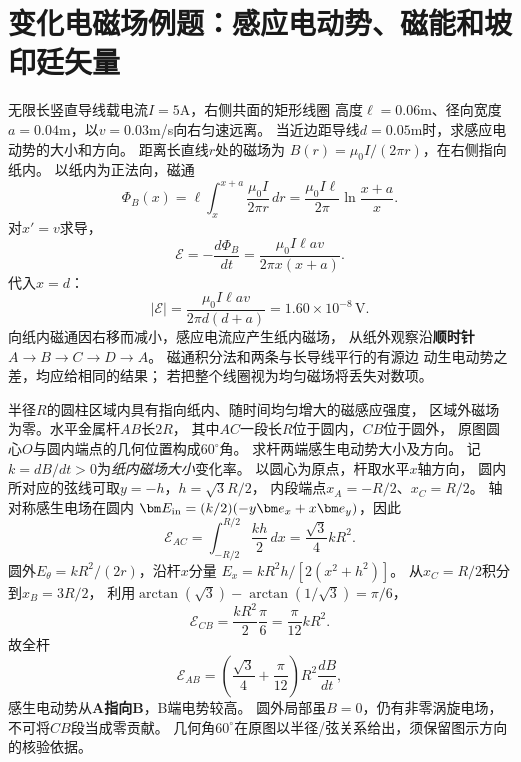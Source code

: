 \section*{变化电磁场例题：感应电动势、磁能和坡印廷矢量}

\problemtext 无限长竖直导线载电流$I=5$A，右侧共面的矩形线圈
高度$\ell=0.06$m、径向宽度$a=0.04$m，以$v=0.03$m/s向右匀速远离。
当近边距导线$d=0.05$m时，求感应电动势的大小和方向。
\workings
距离长直线$r$处的磁场为
$B(r)=\mu_0I/(2\pi r)$，在右侧指向纸内。
以纸内为正法向，磁通
\[
\Phi_B(x)=\ell\int_x^{x+a}\frac{\mu_0I}{2\pi r}\,dr
=\frac{\mu_0I\ell}{2\pi}\ln\frac{x+a}{x}.
\]
对$x'=v$求导，
\[
\mathcal E=-\frac{d\Phi_B}{dt}
=\frac{\mu_0I\ell av}{2\pi x(x+a)}.
\]
代入$x=d$：
\[
\boxed{|\mathcal E|=\frac{\mu_0I\ell av}{2\pi d(d+a)}
=1.60\times10^{-8}\,\mathrm V}.
\]
向纸内磁通因右移而减小，感应电流应产生纸内磁场，
从纸外观察沿\textbf{顺时针}$A\to B\to C\to D\to A$。
\crosscheck 磁通积分法和两条与长导线平行的有源边
动生电动势之差，均应给相同的结果；
若把整个线圈视为均匀磁场将丢失对数项。

\problemtext 半径$R$的圆柱区域内具有指向纸内、随时间均匀增大的磁感应强度，
区域外磁场为零。水平金属杆$AB$长$2R$，
其中$AC$一段长$R$位于圆内，$CB$位于圆外，
原图圆心$O$与圆内端点的几何位置构成$60^\circ$角。
求杆两端感生电动势大小及方向。
\workings
记$k=dB/dt>0$为\emph{纸内磁场大小}变化率。
以圆心为原点，杆取水平$x$轴方向，
圆内所对应的弦线可取$y=-h$，$h=\sqrt3R/2$，
内段端点$x_A=-R/2$、$x_C=R/2$。
轴对称感生电场在圆内
$\bm E_{\rm in}=(k/2)(-y\bm e_x+x\bm e_y)$，因此
\[
\mathcal E_{AC}=\int_{-R/2}^{R/2}\frac{kh}{2}\,dx
=\boxed{\frac{\sqrt3}{4}kR^2}.
\]
圆外$E_\theta=kR^2/(2r)$，沿杆$x$分量
$E_x=kR^2h/[2(x^2+h^2)]$。
从$x_C=R/2$积分到$x_B=3R/2$，
利用$\arctan(\sqrt3)-\arctan(1/\sqrt3)=\pi/6$，
\[
\mathcal E_{CB}
=\frac{kR^2}{2}\frac\pi6
=\boxed{\frac{\pi}{12}kR^2}.
\]
故全杆
\[
\boxed{\mathcal E_{AB}
=\left(\frac{\sqrt3}{4}+\frac{\pi}{12}\right)R^2\frac{dB}{dt}},
\]
感生电动势从\textbf{A指向B}，B端电势较高。
\crosscheck 圆外局部虽$B=0$，仍有非零涡旋电场，
不可将$CB$段当成零贡献。
几何角$60^\circ$在原图以半径/弦关系给出，须保留图示方向的核验依据。

